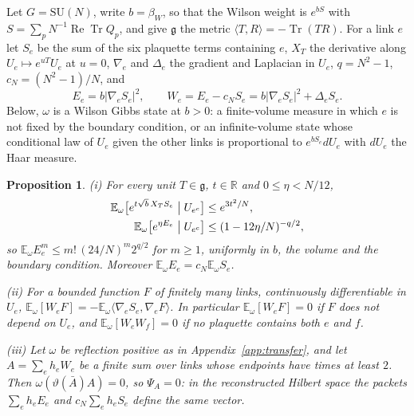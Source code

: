 \documentclass[aps,prd,twocolumn,superscriptaddress,nofootinbib,longbibliography,floatfix,amsmath,amssymb,10pt]{revtex4-2}
\newtheorem{proposition}[theorem]{Proposition}
\theoremstyle{definition}
\theoremstyle{remark}
\newcommand{\R}{\mathbb{R}}
\newcommand{\E}{\mathbb{E}}
\newcommand{\SU}{\mathrm{SU}}
\newcommand{\g}{\mathfrak{g}}
\newcommand{\Tr}{\operatorname{Tr}}
\newcommand{\ReTr}{\operatorname{Re}\operatorname{Tr}}
\newcommand{\ip}[2]{\langle #1,#2\rangle}
\begin{document}
Let $G=\SU(N)$, write $b=\beta_W$, so that the Wilson weight is $e^{bS}$ with
$S=\sum_pN^{-1}\ReTr Q_p$, and give $\g$ the metric $\ip TR=-\Tr(TR)$. For a link
$e$ let $S_e$ be the sum of the six plaquette terms containing $e$, $X_T$ the
derivative along $U_e\mapsto e^{uT}U_e$ at $u=0$, $\nabla_e$ and $\Delta_e$ the
gradient and Laplacian in $U_e$, $q=N^2-1$, $c_N=(N^2-1)/N$, and
\[
E_e=b|\nabla_eS_e|^2,\qquad W_e=E_e-c_NS_e=b|\nabla_eS_e|^2+\Delta_eS_e .
\]
Below, $\omega$ is a Wilson Gibbs state at $b>0$: a finite-volume measure in
which $e$ is not fixed by the boundary condition, or an infinite-volume state
whose conditional law of $U_e$ given the other links is proportional to
$e^{bS_e}dU_e$ with $dU_e$ the Haar measure.

\begin{proposition}\label{prop:force}
\textup{(i)} For every unit $T\in\g$, $t\in\R$ and $0\le\eta<N/12$,
\[
\begin{split}
\E_\omega\bigl[e^{t\sqrt b\,X_TS_e}\bigm|U_{e^c}\bigr]&\le e^{3t^2/N},\\
\E_\omega\bigl[e^{\eta E_e}\bigm|U_{e^c}\bigr]&\le(1-12\eta/N)^{-q/2},
\end{split}
\]
so $\E_\omega E_e^m\le m!\,(24/N)^m2^{q/2}$ for $m\ge1$, uniformly in $b$,
the volume and the boundary condition. Moreover $\E_\omega E_e=c_N\E_\omega
S_e$.

\textup{(ii)} For a bounded function $F$ of finitely many links,
continuously differentiable in $U_e$,
$\E_\omega[W_eF]=-\E_\omega\ip{\nabla_eS_e}{\nabla_eF}$. In particular
$\E_\omega[W_eF]=0$ if $F$ does not depend on $U_e$, and
$\E_\omega[W_eW_f]=0$ if no plaquette contains both $e$ and $f$.

\textup{(iii)} Let $\omega$ be reflection positive as in
Appendix~\textup{\ref{app:transfer}}, and let $A=\sum_eh_eW_e$ be a finite
sum over links whose endpoints have times at least $2$. Then
$\omega(\vartheta(\bar A)A)=0$, so $\Psi_A=0$: in the reconstructed Hilbert
space the packets $\sum_eh_eE_e$ and $c_N\sum_eh_eS_e$ define the same vector.
\end{proposition}
\end{document}

